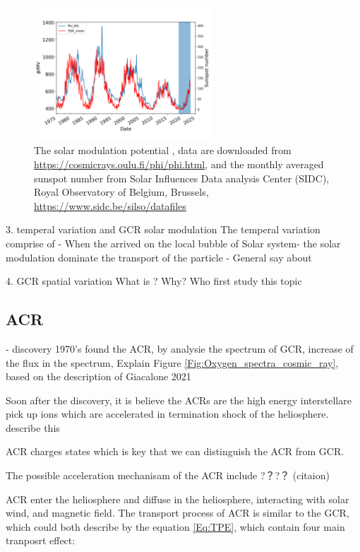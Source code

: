\begin{figure}
	\centering
	\includegraphics[width = 0.6\textwidth]{images/Solar_modulation.png}
	\caption{The solar modulation potential \cite{Usoskin 2011}, data are downloaded from \url{https://cosmicrays.oulu.fi/phi/phi.html}, and the monthly averaged sunspot number from Solar Influences Data analysis Center (SIDC), Royal Observatory of Belgium, Brussels, \url{https://www.sidc.be/silso/datafiles}}
	\label{Fig:Solar_modulation}
\end{figure}


3.  temperal variation and GCR solar modulation 
	 The temperal variation comprise of 
	- When the arrived on the local bubble of Solar system- the solar modulation dominate the transport of the particle - General say about 


4. 	GCR spatial variation
	What is ?
	Why?
	Who first study this topic 



\subsection{ACR}
 - discovery 1970's found the ACR, by analysie the spectrum of GCR, increase of the flux in the spectrum, 
 Explain Figure \ref{Fig:Oxygen_spectra_cosmic_ray}, based on the description of Giacalone 2021

 Soon after the discovery, 
 it is believe the ACRs are the high energy interstellare pick up ions which are accelerated in termination shock of the heliosphere. 
 describe this 

 ACR charges states which is key that we can distinguish the ACR from GCR. 

 The possible acceleration mechanisam of the ACR include ?？?？ (citaion)

ACR enter the heliosphere and diffuse in the heliosphere, interacting with solar wind, and magnetic field. The transport process of ACR is similar to the GCR, which could both describe by the equation \ref{Eq:TPE}, which contain four main tranposrt effect: 

